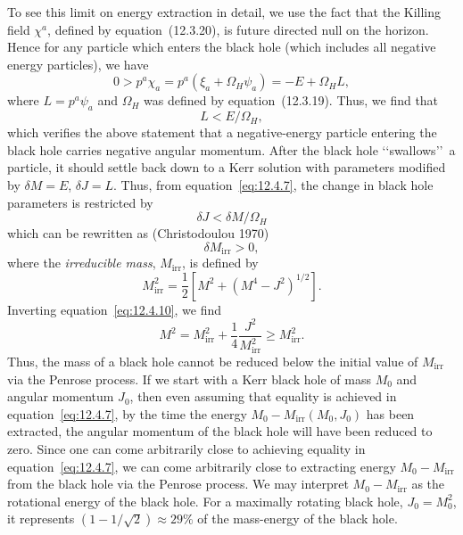 To see this limit on energy extraction in detail, we use the fact that the Killing field
\(\chi^a\), defined by equation~(12.3.20), is future directed null on the horizon.
Hence for any particle which enters the black hole (which includes all negative
energy particles), we have
\begin{equation}
 0>p^a\chi_a=p^a(\xi_a+\Omega_H\psi_a)=-E+\Omega_HL ,
 \tag{12.4.6}\label{eq:12.4.6}
\end{equation}
where \(L=p^a\psi_a\) and \(\Omega_H\) was defined by equation~(12.3.19). Thus,
we find that
\begin{equation}
 L<E/\Omega_H ,
 \tag{12.4.7}\label{eq:12.4.7}
\end{equation}
which verifies the above statement that a negative-energy particle entering the black
hole carries negative angular momentum. After the black hole \lq\lq swallows\rq\rq\ a
particle, it should settle back down to a Kerr solution with parameters modified by
\(\delta M=E\), \(\delta J=L\). Thus, from equation~\eqref{eq:12.4.7}, the change
in black hole parameters is restricted by
\begin{equation}
 \delta J<\delta M/\Omega_H
 \tag{12.4.8}\label{eq:12.4.8}
\end{equation}
which can be rewritten as (Christodoulou 1970)
\begin{equation}
 \delta M_{\mathrm{irr}}>0 ,
 \tag{12.4.9}\label{eq:12.4.9}
\end{equation}
where the \emph{irreducible mass}, \(M_{\mathrm{irr}}\), is defined by
\begin{equation}
 M_{\mathrm{irr}}^2=\frac12\left[M^2+(M^4-J^2)^{1/2}\right] .
 \tag{12.4.10}\label{eq:12.4.10}
\end{equation}
Inverting equation~\eqref{eq:12.4.10}, we find
\begin{equation}
 M^2=M_{\mathrm{irr}}^2+\frac14\frac{J^2}{M_{\mathrm{irr}}^2}
 \geq M_{\mathrm{irr}}^2 .
 \tag{12.4.11}\label{eq:12.4.11}
\end{equation}
Thus, the mass of a black hole cannot be reduced below the initial value of
\(M_{\mathrm{irr}}\) via the Penrose process. If we start with a Kerr black hole of
mass \(M_0\) and angular momentum \(J_0\), then even assuming that equality is
achieved in equation~\eqref{eq:12.4.7}, by the time the energy
\(M_0-M_{\mathrm{irr}}(M_0,J_0)\) has been extracted, the angular momentum of the
black hole will have been reduced to zero. Since one can come arbitrarily close to
achieving equality in equation~\eqref{eq:12.4.7}, we can come arbitrarily close to
extracting energy \(M_0-M_{\mathrm{irr}}\) from the black hole via the Penrose
process. We may interpret \(M_0-M_{\mathrm{irr}}\) as the rotational energy of the
black hole. For a maximally rotating black hole, \(J_0=M_0^2\), it represents
\((1-1/\sqrt2)\approx29\%\) of the mass-energy of the black hole.

